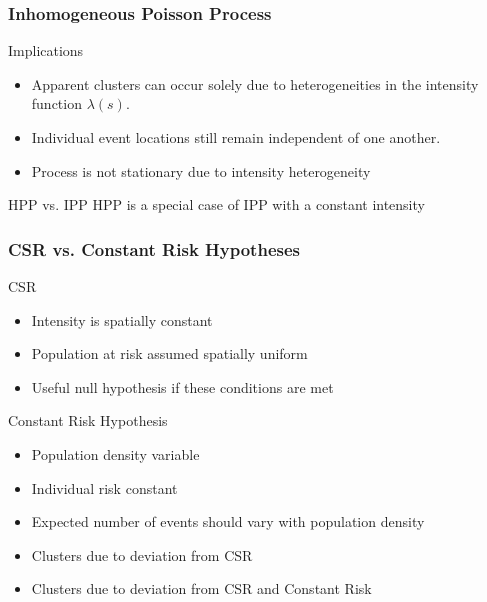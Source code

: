 \documentclass[nototal,handout]{beamer}
\begin{document}
\begin{frame}[<+->]
  \frametitle{Inhomogeneous Poisson Process}
  \begin{block}{Implications}
    \begin{itemize}
      \item Apparent clusters can occur solely due to heterogeneities in the intensity
	function $\lambda(s)$.
      \item Individual event locations still remain independent of one
	another.
      \item Process is not stationary due to intensity heterogeneity
    \end{itemize}
   \end{block}
   \begin{block}{HPP vs. IPP}
       HPP is a special case of IPP with a constant intensity
   \end{block}
 \end{frame}

\begin{frame}[<+->]
  \frametitle{CSR vs. Constant Risk Hypotheses}
  \begin{block}{CSR}
    \begin{itemize}
      \item Intensity is spatially constant 
      \item Population at risk assumed spatially uniform 
      \item Useful null hypothesis if these conditions are met
    \end{itemize}
   \end{block}
  \begin{block}{Constant Risk Hypothesis}

    \begin{itemize}
      \item Population density variable
      \item Individual risk constant
      \item Expected number of events should vary with population density
      \item Clusters due to deviation from CSR
      \item Clusters due to deviation from CSR and Constant Risk
    \end{itemize}

  \end{block}
 \end{frame}
\end{document}
